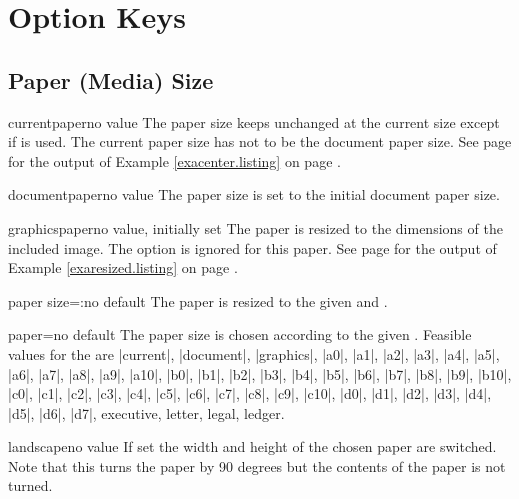 \documentclass[a4paper,11pt]{ltxdoc}
\begin{document}
\clearpage
\section{Option Keys}\label{sec:keys}

\subsection{Paper (Media) Size}\label{sec:papersize}

\begin{docIgrKey}{currentpaper}{}{no value}
  The paper size keeps unchanged at the current size
  except if  is used.
  The current paper size has not to
  be the document paper size.
  See page \pageref{exacenter} for the output
  of Example \ref{exacenter.listing} on page \pageref{exacenter.listing}.
\end{docIgrKey}

\begin{docIgrKey}{documentpaper}{}{no value}
  The paper size is set to the initial document paper size.
\end{docIgrKey}

\begin{docIgrKey}{graphicspaper}{}{no value, initially set}
  The paper is resized to the dimensions of the included image.
  The  option is ignored for this paper.
  See page \pageref{exaresized} for the output
  of Example \ref{exaresized.listing} on page \pageref{exaresized.listing}.
\end{docIgrKey}


\begin{docIgrKey}{paper size}{=:}{no default}
  The paper is resized to the given  and .
\end{docIgrKey}

\begin{docIgrKey}{paper}{=}{no default}
  The paper size is chosen according to the given .
  Feasible values for the  are
  |current|, |document|, |graphics|,
  |a0|, |a1|, |a2|, |a3|, |a4|, |a5|, |a6|, |a7|, |a8|, |a9|, |a10|,
  |b0|, |b1|, |b2|, |b3|, |b4|, |b5|, |b6|, |b7|, |b8|, |b9|, |b10|,
  |c0|, |c1|, |c2|, |c3|, |c4|, |c5|, |c6|, |c7|, |c8|, |c9|, |c10|,
  |d0|, |d1|, |d2|, |d3|, |d4|, |d5|, |d6|, |d7|,
  executive, letter, legal, ledger.
\end{docIgrKey}

\begin{docIgrKey}{landscape}{}{no value}
  If set the width and height of the chosen paper are switched. Note that
  this turns the paper by 90 degrees but the contents of the paper is not
  turned.
\end{docIgrKey}
\end{document}
